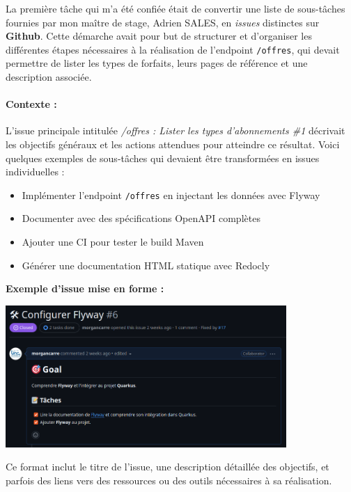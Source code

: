 \documentclass[11pt]{article}
\begin{document}
		La première tâche qui m’a été confiée était de convertir une liste de sous-tâches fournies par mon maître de stage, Adrien SALES, en \textit{issues} distinctes sur \textbf{Github}. Cette démarche avait pour but de structurer et d’organiser les différentes étapes nécessaires à la réalisation de l’endpoint \texttt{/offres}, qui devait permettre de lister les types de forfaits, leurs pages de référence et une description associée.
		
		\paragraph{Contexte : }
		
		L’issue principale intitulée \textit{/offres : Lister les types d'abonnements \#1} décrivait les objectifs généraux et les actions attendues pour atteindre ce résultat. Voici quelques exemples de sous-tâches qui devaient être transformées en issues individuelles :
		
		\begin{itemize}
			\item Implémenter l'endpoint \texttt{/offres} en injectant les données avec Flyway
			\item Documenter avec des spécifications OpenAPI complètes
			\item Ajouter une CI pour tester le build Maven
			\item Générer une documentation HTML statique avec Redocly
		\end{itemize}
		\begin{center}
			\textbf{Exemple d'issue mise en forme :}
		\end{center}
		\begin{center}
			\includegraphics[width=0.8\textwidth]{asset/ex_issue.png}
		\end{center}
		
		Ce format inclut le titre de l’issue, une description détaillée des objectifs, et parfois des liens vers des ressources ou des outils nécessaires à sa réalisation.
		
\end{document}
